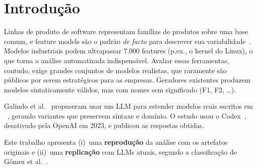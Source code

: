 \section{Introdução}
\label{sec:introducao}

Linhas de produto de software representam famílias de produtos sobre uma base comum, e feature models são o padrão \emph{de facto} para descrever sua variabilidade~\cite{galindo2023llm}. Modelos industriais podem ultrapassar 7.000 features (p.ex., o kernel do Linux), o que torna a análise automatizada indispensável. Avaliar essas ferramentas, contudo, exige grandes conjuntos de modelos realistas, que raramente são públicos por serem estratégicos para as empresas. Geradores existentes produzem modelos sintaticamente válidos, mas com nomes sem significado (F1, F2, \ldots).

Galindo et al.~\cite{galindo2023llm} propuseram usar um LLM para estender modelos reais escritos em \uvl{}~\cite{sundermann2021uvl}, gerando variantes que preservem sintaxe e domínio. O estudo usou o Codex~\cite{chen2021codex}, desativado pela OpenAI em 2023, e publicou as respostas obtidas.

Este trabalho apresenta (i)~uma \textbf{reprodução} da análise com os artefatos originais e (ii)~uma \textbf{replicação} com LLMs atuais, segundo a classificação de Gómez et al.~\cite{gomez2014replication}. 

